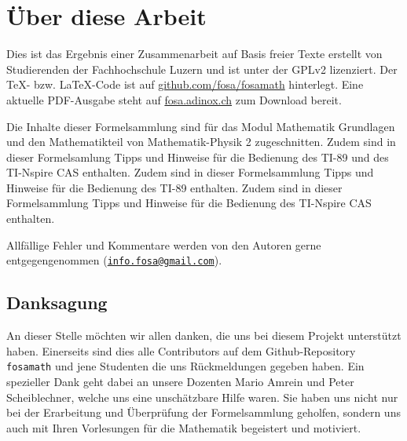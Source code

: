 



\chapter*{Über diese Arbeit}
Dies ist das Ergebnis einer Zusammenarbeit auf Basis freier Texte erstellt von 
Studierenden der Fachhochschule Luzern und ist unter der GPLv2 lizenziert. 
Der \TeX - bzw. \LaTeX -Code ist auf \url{github.com/fosa/fosamath} 
hinterlegt. Eine aktuelle PDF-Ausgabe steht auf \url{fosa.adinox.ch} zum 
Download bereit.

Die Inhalte dieser Formelsammlung sind für das Modul Mathematik Grundlagen 
und den Mathematikteil von Mathematik-Physik 2 zugeschnitten. 
%
\iftiboth
	Zudem sind in dieser Formelsamlung Tipps und Hinweise für die Bedienung 
    des TI-89 und des TI-Nspire CAS enthalten. 
	\else
	\ifti
		Zudem sind in dieser Formelsammlung Tipps und Hinweise für die 
        Bedienung des TI-89 enthalten. 
	\fi
	\ifnspire
		Zudem sind in dieser Formelsammlung Tipps und Hinweise für die 
        Bedienung des TI-Nspire CAS enthalten. 
	\fi
\fi

Allfällige Fehler und Kommentare werden von den Autoren gerne entgegengenommen
(\href{mailto:info.fosa@gmail.com}{\nolinkurl{info.fosa@gmail.com}}).

\section*{Danksagung}
An dieser Stelle möchten wir allen danken, die uns bei diesem Projekt 
unterstützt haben.
Einerseits sind dies alle Contributors auf dem Github-Repository 
\verb!fosamath! und jene Studenten die uns Rückmeldungen gegeben haben.
Ein spezieller Dank geht dabei an unsere Dozenten Mario Amrein und Peter 
Scheiblechner, welche uns eine unschätzbare Hilfe waren.
Sie haben uns nicht nur bei der Erarbeitung und Überprüfung der Formelsammlung 
geholfen, sondern uns auch mit Ihren Vorlesungen für die Mathematik begeistert 
und motiviert.


